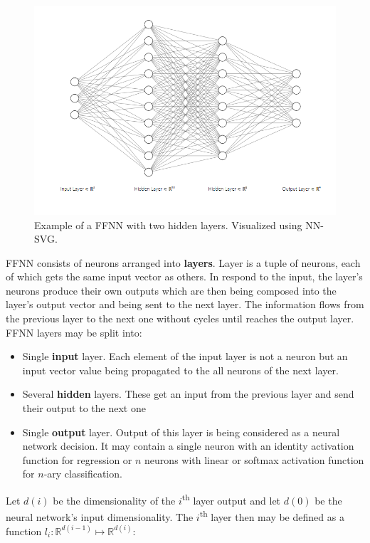 \documentclass[thesis=B,english]{FITthesis}[2019/12/23]
\begin{document}
	\begin{figure}[h]
		\includegraphics[width=\textwidth]{images/ffnn.png}
		\caption{Example of a FFNN with two hidden layers. Visualized using NN-SVG\cite{nn-svg}.}
	\end{figure}
	
	FFNN consists of neurons arranged into \textbf{layers}. Layer is a tuple of neurons, each of which gets the same input vector as others. In respond to the input, the layer's neurons produce their own outputs which are then being composed into the layer's output vector and being sent to the next layer. The information flows from the previous layer to the next one without cycles until reaches the output layer. FFNN layers may be split into:
	\begin{itemize}
		\item Single \textbf{input} layer. Each element of the input layer is not a neuron but an input vector value being propagated to the all neurons of the next layer.
		\item Several \textbf{hidden} layers. These get an input from the previous layer and send their output to the next one
		\item Single \textbf{output} layer. Output of this layer is being considered as a neural network decision. It may contain a single neuron with an identity activation function for regression or $n$ neurons with linear or softmax\cite{softmax} activation function for $n$-ary classification.
	\end{itemize}
	
	Let $d(i)$ be the dimensionality of the $i$\textsuperscript{th} layer output and let $d(0)$ be the neural network's input dimensionality. The $i$\textsuperscript{th} layer then may be defined as a function $l_i : \mathbb{R}^{d(i-1)} \mapsto \mathbb{R}^{d(i)}$:
	
\end{document}
